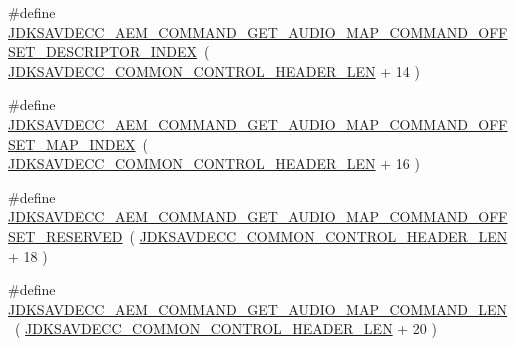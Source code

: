\begin{DoxyCompactItemize}
\#define \hyperlink{group__command__get__audio__map_ga671073f84c48e76a17d3e4cc2ef152f4}{J\+D\+K\+S\+A\+V\+D\+E\+C\+C\+\_\+\+A\+E\+M\+\_\+\+C\+O\+M\+M\+A\+N\+D\+\_\+\+G\+E\+T\+\_\+\+A\+U\+D\+I\+O\+\_\+\+M\+A\+P\+\_\+\+C\+O\+M\+M\+A\+N\+D\+\_\+\+O\+F\+F\+S\+E\+T\+\_\+\+D\+E\+S\+C\+R\+I\+P\+T\+O\+R\+\_\+\+I\+N\+D\+EX}~( \hyperlink{group__jdksavdecc__avtp__common__control__header_gaae84052886fb1bb42f3bc5f85b741dff}{J\+D\+K\+S\+A\+V\+D\+E\+C\+C\+\_\+\+C\+O\+M\+M\+O\+N\+\_\+\+C\+O\+N\+T\+R\+O\+L\+\_\+\+H\+E\+A\+D\+E\+R\+\_\+\+L\+EN} + 14 )
\item 
\#define \hyperlink{group__command__get__audio__map_ga034312d360ba73358cdb32225b9da8d3}{J\+D\+K\+S\+A\+V\+D\+E\+C\+C\+\_\+\+A\+E\+M\+\_\+\+C\+O\+M\+M\+A\+N\+D\+\_\+\+G\+E\+T\+\_\+\+A\+U\+D\+I\+O\+\_\+\+M\+A\+P\+\_\+\+C\+O\+M\+M\+A\+N\+D\+\_\+\+O\+F\+F\+S\+E\+T\+\_\+\+M\+A\+P\+\_\+\+I\+N\+D\+EX}~( \hyperlink{group__jdksavdecc__avtp__common__control__header_gaae84052886fb1bb42f3bc5f85b741dff}{J\+D\+K\+S\+A\+V\+D\+E\+C\+C\+\_\+\+C\+O\+M\+M\+O\+N\+\_\+\+C\+O\+N\+T\+R\+O\+L\+\_\+\+H\+E\+A\+D\+E\+R\+\_\+\+L\+EN} + 16 )
\item 
\#define \hyperlink{group__command__get__audio__map_ga5a62a1c3ec5539546f96c1c28abecfcb}{J\+D\+K\+S\+A\+V\+D\+E\+C\+C\+\_\+\+A\+E\+M\+\_\+\+C\+O\+M\+M\+A\+N\+D\+\_\+\+G\+E\+T\+\_\+\+A\+U\+D\+I\+O\+\_\+\+M\+A\+P\+\_\+\+C\+O\+M\+M\+A\+N\+D\+\_\+\+O\+F\+F\+S\+E\+T\+\_\+\+R\+E\+S\+E\+R\+V\+ED}~( \hyperlink{group__jdksavdecc__avtp__common__control__header_gaae84052886fb1bb42f3bc5f85b741dff}{J\+D\+K\+S\+A\+V\+D\+E\+C\+C\+\_\+\+C\+O\+M\+M\+O\+N\+\_\+\+C\+O\+N\+T\+R\+O\+L\+\_\+\+H\+E\+A\+D\+E\+R\+\_\+\+L\+EN} + 18 )
\item 
\#define \hyperlink{group__command__get__audio__map_ga7b45da8d0aff8a96f43af7c25003dfcc}{J\+D\+K\+S\+A\+V\+D\+E\+C\+C\+\_\+\+A\+E\+M\+\_\+\+C\+O\+M\+M\+A\+N\+D\+\_\+\+G\+E\+T\+\_\+\+A\+U\+D\+I\+O\+\_\+\+M\+A\+P\+\_\+\+C\+O\+M\+M\+A\+N\+D\+\_\+\+L\+EN}~( \hyperlink{group__jdksavdecc__avtp__common__control__header_gaae84052886fb1bb42f3bc5f85b741dff}{J\+D\+K\+S\+A\+V\+D\+E\+C\+C\+\_\+\+C\+O\+M\+M\+O\+N\+\_\+\+C\+O\+N\+T\+R\+O\+L\+\_\+\+H\+E\+A\+D\+E\+R\+\_\+\+L\+EN} + 20 )
\end{DoxyCompactItemize}
